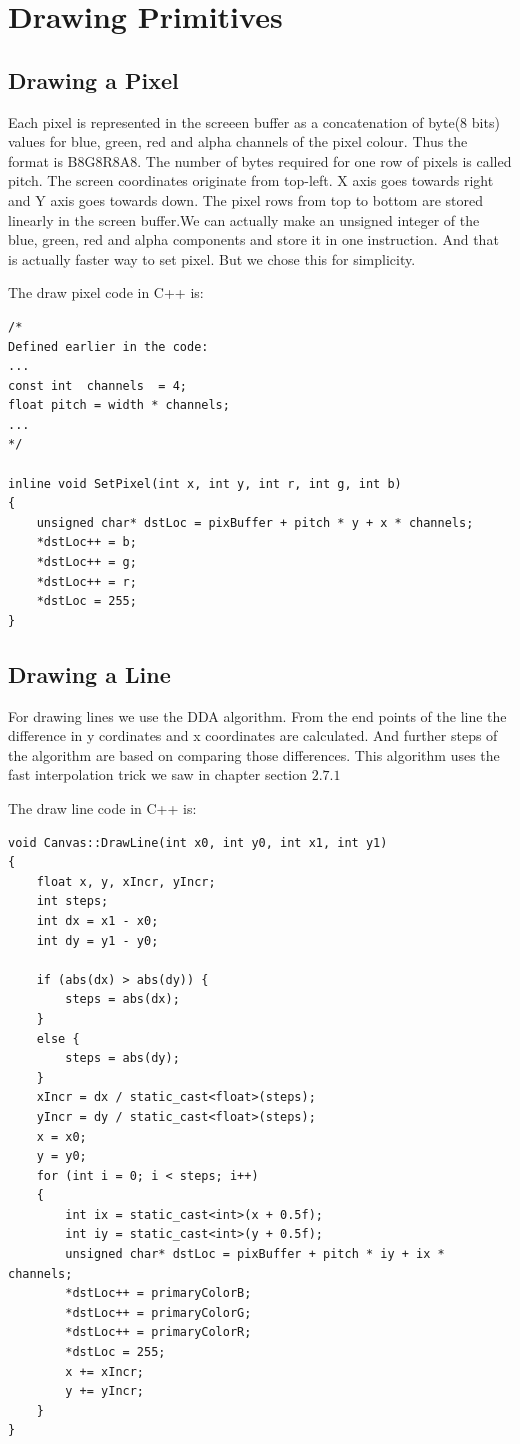\chapter{Drawing Primitives}
\section{Drawing a Pixel}
Each pixel is represented in the screeen buffer as a concatenation of byte(8 bits) values for blue, green, red and alpha channels of the pixel colour. Thus the format is B8G8R8A8. The number of bytes required for one row of pixels is called pitch. The screen coordinates originate from top-left. X axis goes towards right and Y axis goes towards down. The pixel rows from top to bottom are stored linearly in the screen buffer.We can actually make an unsigned integer of the blue, green, red and alpha components and store it in one instruction. And that is actually faster way to set pixel. But we chose this for simplicity.

The draw pixel code in C++ is:\\
\lstset{style=cpp}
\begin{lstlisting}
/*
Defined earlier in the code:
...
const int  channels  = 4;
float pitch = width * channels;
...
*/

inline void SetPixel(int x, int y, int r, int g, int b) 
{
	unsigned char* dstLoc = pixBuffer + pitch * y + x * channels;
	*dstLoc++ = b;
	*dstLoc++ = g;
	*dstLoc++ = r;
	*dstLoc = 255;
}

\end{lstlisting}
\clearpage 

\section{Drawing a Line}
For drawing lines we use the DDA algorithm. From the end points of the line the difference in y cordinates and x coordinates are calculated. And further steps of the algorithm are based on comparing those differences. This algorithm uses the fast interpolation trick we saw in chapter section $2.7.1$

The draw line code in C++ is:\\
\lstset{style=cpp}
\begin{lstlisting}
void Canvas::DrawLine(int x0, int y0, int x1, int y1)
{
	float x, y, xIncr, yIncr;
	int steps;
	int dx = x1 - x0;
	int dy = y1 - y0;

	if (abs(dx) > abs(dy)) {
		steps = abs(dx);
	}
	else {
		steps = abs(dy);
	}
	xIncr = dx / static_cast<float>(steps);
	yIncr = dy / static_cast<float>(steps);
	x = x0;
	y = y0;
	for (int i = 0; i < steps; i++)
	{
		int ix = static_cast<int>(x + 0.5f);
		int iy = static_cast<int>(y + 0.5f);
		unsigned char* dstLoc = pixBuffer + pitch * iy + ix * channels;
		*dstLoc++ = primaryColorB;
		*dstLoc++ = primaryColorG;
		*dstLoc++ = primaryColorR;
		*dstLoc = 255;
		x += xIncr;
		y += yIncr;
	}
}
\end{lstlisting}

